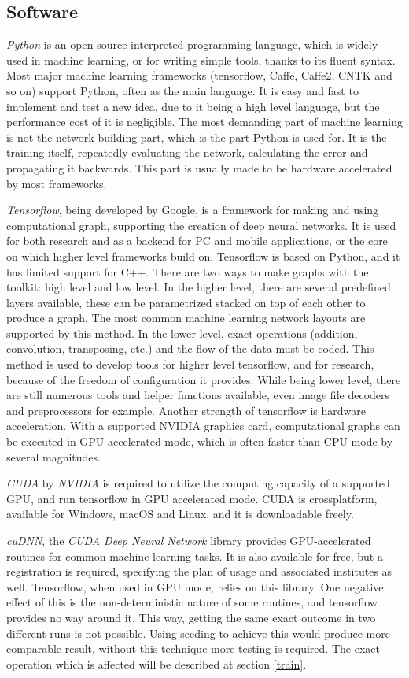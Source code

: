 \documentclass[12pt]{report}
\begin{document}
\subsection{Software}
\textit{Python} is an open source interpreted programming language, which is widely used in machine learning, or for writing simple tools, thanks to its fluent syntax. Most major machine learning frameworks (tensorflow, Caffe, Caffe2, CNTK and so on) support Python, often as the main language. It is easy and fast to implement and test a new idea, due to it being a high level language, but the performance cost of it is negligible. The most demanding part of machine learning is not the network building part, which is the part Python is used for. It is the training itself, repeatedly evaluating the network, calculating the error and propagating it backwards. This part is usually made to be hardware accelerated by most frameworks.

\textit{Tensorflow}, being developed by Google, is a framework for making and using computational graph, supporting the creation of deep neural networks. It is used for both research and as a backend for PC and mobile applications, or the core on which higher level frameworks build on. Tensorflow is based on Python, and it has limited support for C++. There are two ways to make graphs with the toolkit: high level and low level. In the higher level, there are several predefined layers available, these can be parametrized stacked on top of each other to produce a graph. The most common machine learning network layouts are supported by this method. In the lower level, exact operations (addition, convolution, transposing, etc.) and the flow of the data must be coded. This method is used to develop tools for higher level tensorflow, and for research, because of the freedom of configuration it provides. While being lower level, there are still numerous tools and helper functions available, even image file decoders and preprocessors for example. Another strength of tensorflow is hardware acceleration. With a supported NVIDIA graphics card, computational graphs can be executed in GPU accelerated mode, which is often faster than CPU mode by several magnitudes.

\textit{CUDA} by \textit{NVIDIA} is required to utilize the computing capacity of a supported GPU, and run tensorflow in GPU accelerated mode. CUDA is crossplatform, available for Windows, macOS and Linux, and it is downloadable freely.

\label{cudnn}
\textit{cuDNN}, the \textit{CUDA Deep Neural Network} library provides GPU-accelerated routines for common machine learning tasks. It is also available for free, but a registration is required, specifying the plan of usage and associated institutes as well. Tensorflow, when used in GPU mode, relies on this library. One negative effect of this is the non-deterministic nature of some routines, and tensorflow provides no way around it. This way, getting the same exact outcome in two different runs is not possible. Using seeding to achieve this would produce more comparable result, without this technique more testing is required. The exact operation which is affected will be described at section \ref{train}.
\end{document}
